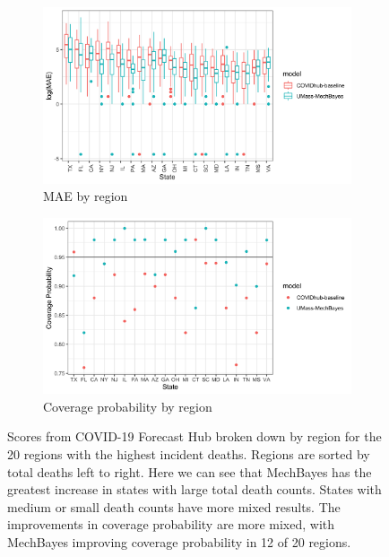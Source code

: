 \documentclass{umassthesis}          %
\begin{document}
\begin{figure}
  \centering

\begin{subfigure}{\textwidth}
  \centering
    \includegraphics[scale=.2]{mae_results_by_region_inc.png}
    \caption{MAE by region}
\end{subfigure}
\begin{subfigure}{\textwidth}
  \centering
    \includegraphics[scale=.20]{cp_results_by_location.png}
    \caption{Coverage probability by region}
\end{subfigure}
\caption{Scores from COVID-19 Forecast Hub broken down by region for the 20 regions with the highest incident deaths. Regions are sorted by total deaths left to right. Here we can see that MechBayes has the greatest increase in states with large total death counts. States with medium or small death counts have more mixed results. The improvements in coverage probability are more mixed, with MechBayes improving coverage probability in 12 of 20 regions. }
\label{fig:covidhub_region_results}
\end{figure}
\end{document}
